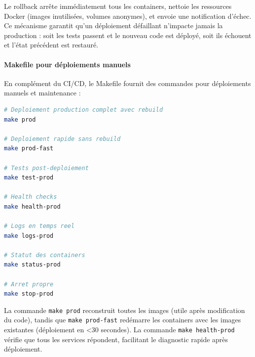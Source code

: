 Le rollback arrête immédiatement tous les containers, nettoie les ressources Docker (images inutilisées, volumes anonymes), et envoie une notification d'échec. Ce mécanisme garantit qu'un déploiement défaillant n'impacte jamais la production : soit les tests passent et le nouveau code est déployé, soit ils échouent et l'état précédent est restauré.

\paragraph{Makefile pour déploiements manuels}

En complément du CI/CD, le Makefile fournit des commandes pour déploiements manuels et maintenance :

\begin{lstlisting}[language=bash, caption=Commandes Makefile (extrait)]
# Deploiement production complet avec rebuild
make prod

# Deploiement rapide sans rebuild
make prod-fast

# Tests post-deploiement
make test-prod

# Health checks
make health-prod

# Logs en temps reel
make logs-prod

# Statut des containers
make status-prod

# Arret propre
make stop-prod
\end{lstlisting}

La commande \texttt{make prod} reconstruit toutes les images (utile après modification du code), tandis que \texttt{make prod-fast} redémarre les containers avec les images existantes (déploiement en <30 secondes). La commande \texttt{make health-prod} vérifie que tous les services répondent, facilitant le diagnostic rapide après déploiement.